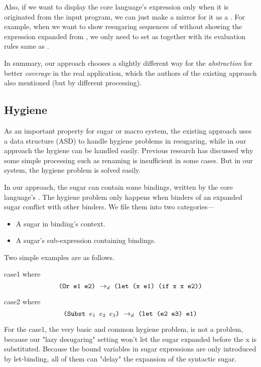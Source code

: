 Also, if we want to display the core language's expression only when it is originated from the input program, we can just make a mirror for it as a . For example, when we want to show resugaring sequences of  
without showing the  expression expanded from , we only need to set  as  together with its evaluation rules same as .

In summary, our approach chooses a slightly different way for the \emph{abstraction} for better \emph{coverage} in the real application, which the authors of the existing approach also mentioned (but by different processing). 


\subsection{Hygiene}
\label{mark:hygiene}

As an important property for sugar or macro system, the existing approach uses a data structure (ASD) to handle hygiene problems in resugaring, while in our approach the hygiene can be handled easily. Previous research\cite{EssenceofHygiene} has discussed why some simple processing such as renaming is insufficient in some cases. But in our system, the hygiene problem is solved easily. 

In our approach, the sugar can contain some bindings, written by the core language's . The hygiene problem only happens when binders of an expanded sugar conflict with other binders. We file them into two categories---
\begin{itemize}
\item A sugar in binding's context.
\item A sugar's sub-expression containing bindings.
\end{itemize}
Two simple examples are as follows.

\begin{center}
	\hfill case1 {\scriptsize{where \[\texttt{(Or~e1~e2)} ~\rightarrow_d~ \texttt{(let (x e1) (if x x e2))}\]}}

 \hfill case2{
\scriptsize{
where \[
\texttt{(Subst $e_1$ $e_2$ $e_3$)} ~\rightarrow_d~ \texttt{(let (e2 e3) e1)}
\]}}
\end{center}



For the case1, the very basic and common hygiene problem, is not a problem, because our "lazy desugaring" setting won't let the sugar  expanded before the x is substituted. Because the bound variables in sugar expressions are only introduced by let-binding, all of them can "delay" the expansion of the syntactic sugar.


